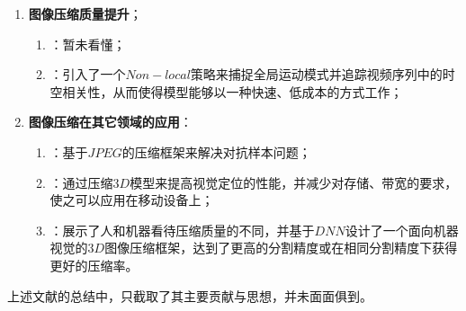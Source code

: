 \documentclass[UTF8]{ctexart}
\begin{document}
\begin{enumerate}[leftmargin=50pt]
\begin{enumerate}[leftmargin=20pt]
            			\end{enumerate}                    
                    \item \textbf{图像压缩质量提升}；
            			\begin{enumerate}[leftmargin=20pt]
            				\item \cite{Fu_2019_ICCV}：暂未看懂；
                            \item \cite{Xu_2019_ICCV}：引入了一个$Non-local$策略来捕捉全局运动模式并追踪视频序列中的时空相关性，从而使得模型能够以一种快速、低成本的方式工作；
            			\end{enumerate}                    
                    \item \textbf{图像压缩在其它领域的应用}：
            			\begin{enumerate}[leftmargin=20pt]
            				\item \cite{liu2019feature}：基于$JPEG$的压缩框架来解决对抗样本问题；
                            \item \cite{camposeco2019hybrid}：通过压缩$3D$模型来提高视觉定位的性能，并减少对存储、带宽的要求，使之可以应用在移动设备上；
                            \item \cite{liu2019machine}：展示了人和机器看待压缩质量的不同，并基于$DNN$设计了一个面向机器视觉的$3D$图像压缩框架，达到了更高的分割精度或在相同分割精度下获得更好的压缩率。
            			\end{enumerate}                    
                    
    			\end{enumerate}
        
        \indent 上述文献的总结中，只截取了其主要贡献与思想，并未面面俱到。
%	
%    

            
\end{document}
